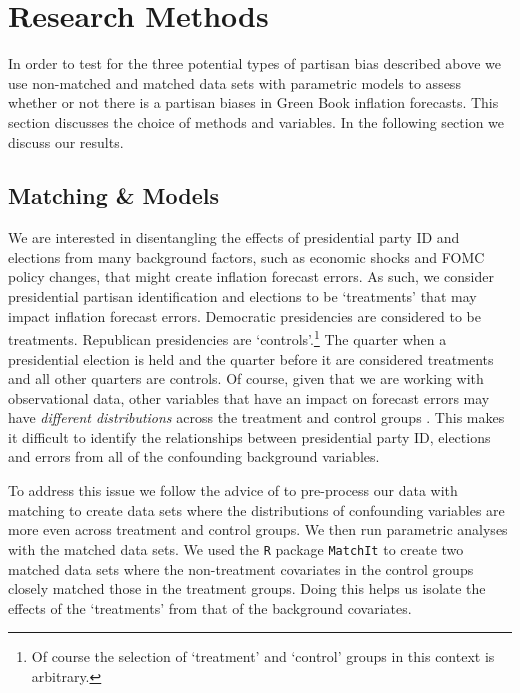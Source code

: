 \documentclass[a4paper]{article}\usepackage{graphicx, color}
\begin{document}

\section{Research Methods}

In order to test for the three potential types of partisan bias described above we use non-matched and matched data sets with parametric models \citep[see][]{Ho2007} to assess whether or not there is a partisan biases in Green Book inflation forecasts. This section discusses the choice of methods and variables. In the following section we discuss our results.

\subsection{Matching \& Models}

We are interested in disentangling the effects of presidential party ID and elections from  many background factors, such as economic shocks and FOMC policy changes, that might create inflation forecast errors. As such, we consider presidential partisan identification and elections to be `treatments' that may impact inflation forecast errors. Democratic presidencies are considered to be treatments. Republican presidencies are `controls'.\footnote{Of course the selection of `treatment' and `control' groups in this context is arbitrary.} The quarter when a presidential election is held and the quarter before it are considered treatments and all other quarters are controls. Of course, given that we are working with observational data, other variables that have an impact on forecast errors may have {\emph{different distributions}} across the treatment and control groups \citep{Cochran1973, Diamond2012}. This makes it difficult to identify the relationships between presidential party ID, elections and errors from all of the confounding background variables.

To address this issue we follow the advice of \cite{Ho2007} to pre-process our data with matching to create data sets where the distributions of confounding variables are more even across treatment and control groups. We then run parametric analyses with the matched data sets. We used the {\tt{R}} package {\tt{MatchIt}} \citep{matchit2011} to create two matched data sets where the non-treatment covariates in the control groups closely matched those in the treatment groups. Doing this helps us isolate the effects of the `treatments' from that of the background covariates. 
\end{document}
